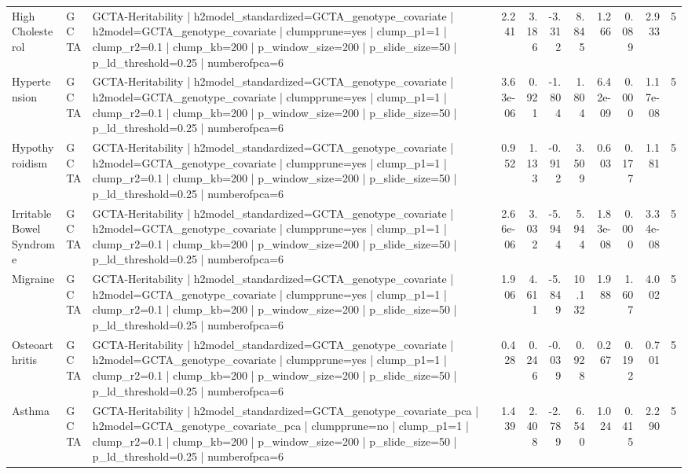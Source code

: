 \begin{landscape}
\begin{longtable}{p{2.4cm}p{1.8cm}p{6.0cm}rrrrrrrr}
High Cholesterol & GCTA & GCTA-Heritability | h2model\_standardized=GCTA\_genotype\_covariate | h2model=GCTA\_genotype\_covariate | clumpprune=yes | clump\_p1=1 | clump\_r2=0.1 | clump\_kb=200 | p\_window\_size=200 | p\_slide\_size=50 | p\_ld\_threshold=0.25 | numberofpca=6 & 2.241 & 3.186 & -3.312 & 8.845 & 1.266 & 0.089 & 2.933 & 5 \\
Hypertension & GCTA & GCTA-Heritability | h2model\_standardized=GCTA\_genotype\_covariate | h2model=GCTA\_genotype\_covariate | clumpprune=yes | clump\_p1=1 | clump\_r2=0.1 | clump\_kb=200 | p\_window\_size=200 | p\_slide\_size=50 | p\_ld\_threshold=0.25 | numberofpca=6 & 3.63e-06 & 0.921 & -1.804 & 1.804 & 6.42e-09 & 0.000 & 1.17e-08 & 5 \\
Hypothyroidism & GCTA & GCTA-Heritability | h2model\_standardized=GCTA\_genotype\_covariate | h2model=GCTA\_genotype\_covariate | clumpprune=yes | clump\_p1=1 | clump\_r2=0.1 | clump\_kb=200 | p\_window\_size=200 | p\_slide\_size=50 | p\_ld\_threshold=0.25 | numberofpca=6 & 0.952 & 1.133 & -0.912 & 3.509 & 0.603 & 0.177 & 1.181 & 5 \\
Irritable Bowel Syndrome & GCTA & GCTA-Heritability | h2model\_standardized=GCTA\_genotype\_covariate | h2model=GCTA\_genotype\_covariate | clumpprune=yes | clump\_p1=1 | clump\_r2=0.1 | clump\_kb=200 | p\_window\_size=200 | p\_slide\_size=50 | p\_ld\_threshold=0.25 | numberofpca=6 & 2.66e-06 & 3.032 & -5.944 & 5.944 & 1.83e-08 & 0.000 & 3.34e-08 & 5 \\
Migraine & GCTA & GCTA-Heritability | h2model\_standardized=GCTA\_genotype\_covariate | h2model=GCTA\_genotype\_covariate | clumpprune=yes | clump\_p1=1 | clump\_r2=0.1 | clump\_kb=200 | p\_window\_size=200 | p\_slide\_size=50 | p\_ld\_threshold=0.25 | numberofpca=6 & 1.906 & 4.611 & -5.849 & 10.132 & 1.988 & 1.607 & 4.002 & 5 \\
Osteoarthritis & GCTA & GCTA-Heritability | h2model\_standardized=GCTA\_genotype\_covariate | h2model=GCTA\_genotype\_covariate | clumpprune=yes | clump\_p1=1 | clump\_r2=0.1 | clump\_kb=200 | p\_window\_size=200 | p\_slide\_size=50 | p\_ld\_threshold=0.25 | numberofpca=6 & 0.428 & 0.246 & -0.039 & 0.928 & 0.267 & 0.192 & 0.701 & 5 \\
Asthma & GCTA & GCTA-Heritability | h2model\_standardized=GCTA\_genotype\_covariate\_pca | h2model=GCTA\_genotype\_covariate\_pca | clumpprune=no | clump\_p1=1 | clump\_r2=0.1 | clump\_kb=200 | p\_window\_size=200 | p\_slide\_size=50 | p\_ld\_threshold=0.25 | numberofpca=6 & 1.439 & 2.408 & -2.789 & 6.540 & 1.024 & 0.415 & 2.290 & 5 \\

\end{longtable}
\end{landscape}
